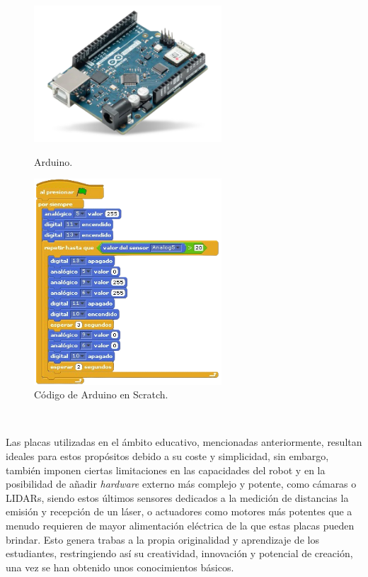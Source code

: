 \begin{figure}[h!]
  \centering
  \begin{minipage}{0.45\textwidth}
    \centering
    \includegraphics[width=7cm]{figs/arduino}
    \caption{Arduino.}
    \label{fig:arduino}
  \end{minipage}
  \hfill
  \begin{minipage}{0.45\textwidth}
    \centering
    \includegraphics[width=7cm]{figs/scratch_arduino_code}
    \caption{Código de Arduino en Scratch.}
    \label{fig:scratch}
  \end{minipage}
\end{figure}\

Las placas utilizadas en el ámbito educativo, mencionadas anteriormente,
resultan ideales para estos propósitos debido a su coste y simplicidad, sin
embargo, también imponen ciertas limitaciones en las capacidades del robot y en
la posibilidad de añadir \textit{hardware} externo más complejo y potente, como
cámaras o LIDARs, siendo estos últimos sensores dedicados a la medición de
distancias la emisión y recepción de un láser, o actuadores como motores más
potentes que a menudo requieren de mayor alimentación eléctrica de la que estas
placas pueden brindar.
Esto genera trabas a la propia originalidad y aprendizaje de los estudiantes,
restringiendo así su creatividad, innovación y potencial de creación, una vez se
han obtenido unos conocimientos básicos.

